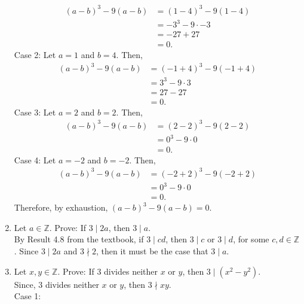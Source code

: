 \documentclass[12pt]{article}
\newcommand{\Z}{\mathbb{Z}}
\begin{document}
\begin{enumerate}
\begin{equation*}
            \begin{split}
                (a-b)^3-9(a-b)&=(1-4)^3-9(1-4)\\
                &=-3^3-9\cdot-3\\
                &=-27+27\\
                &=0.
            \end{split}
        \end{equation*}
        Case 2: Let \(a=1\) and \(b=4\). Then, \begin{equation*}
            \begin{split}
                (a-b)^3-9(a-b)&=(-1+4)^3-9(-1+4)\\
                &=3^3-9\cdot3\\
                &=27-27\\
                &=0.
            \end{split}
        \end{equation*}
        Case 3: Let \(a=2\) and \(b=2\). Then, \begin{equation*}
            \begin{split}
                (a-b)^3-9(a-b)&=(2-2)^3-9(2-2)\\
                &=0^3-9\cdot 0\\
                &=0.
            \end{split}
        \end{equation*}
        Case 4: Let \(a=-2\) and \(b=-2\). Then, \begin{equation*}
            \begin{split}
                (a-b)^3-9(a-b)&=(-2+2)^3-9(-2+2)\\
                &=0^3-9\cdot 0\\
                &=0.
            \end{split}
        \end{equation*}
        Therefore, by exhaustion, \((a-b)^3-9(a-b)=0\).
        \item Let \(a\in\Z\). Prove: If \(3 \mid 2a\), then \(3\mid a\).\\ By Result 4.8 from the textbook, if \(3\mid cd\), then \(3\mid c\) or \(3\mid d\), for some \(c, d\in\Z\). Since \(3\mid 2a\) and \(3\nmid 2\), then it must be the case that \(3\mid a\).
        \item Let \(x,y\in\Z\). Prove: If 3 divides neither \(x\) or \(y\), then \(3\mid (x^2-y^2)\).\\ Since, 3 divides neither \(x\) or \(y\), then \(3\nmid xy\).\\ 
        Case 1: 
        \end{enumerate}
\end{document}
